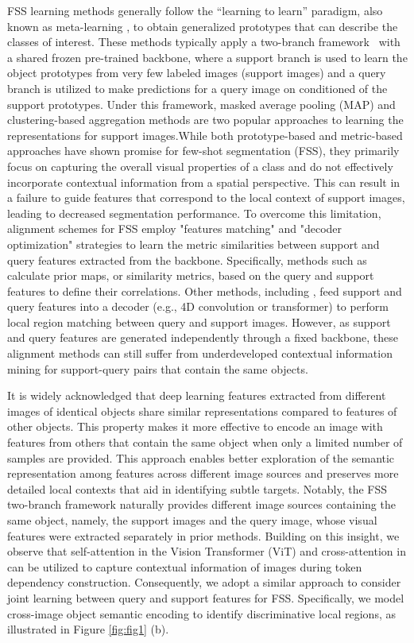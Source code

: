 \documentclass[conference]{IEEEtran}
\begin{document}
FSS learning methods generally follow the ``learning to learn'' paradigm, also known as meta-learning \cite{Siamese, tian2020rethinking}, to obtain generalized prototypes that can describe the classes of interest. 
These methods typically apply a two-branch framework~\cite{RN4, RN5,RN10} with a shared frozen pre-trained backbone, where a support branch is used to learn the object prototypes from very few labeled images (support images) and a query branch is utilized to make predictions for a query image on conditioned of the support prototypes. 
Under this framework, masked average pooling (MAP) \cite{ RN5, PANet, RN10} and clustering-based aggregation methods \cite{RN6, ASGNet, Part-aware-prototype} are two popular approaches to learning the representations for support images.While both prototype-based and metric-based approaches have shown promise for few-shot segmentation (FSS), they primarily focus on capturing the overall visual properties of a class and do not effectively incorporate contextual information from a spatial perspective. This can result in a failure to guide features that correspond to the local context of support images, leading to decreased segmentation performance. To overcome this limitation, alignment schemes for FSS employ "features matching" and "decoder optimization" strategies to learn the metric similarities between support and query features extracted from the backbone. Specifically, methods such as \cite{PFENet, ASGNet, MLC} calculate prior maps, or similarity metrics, based on the query and support features to define their correlations. Other methods, including \cite{CWTans, CyCTR, HSNet}, feed support and query features into a decoder (e.g., 4D convolution or transformer) to perform local region matching between query and support images. However, as support and query features are generated independently through a fixed backbone, these alignment methods can still suffer from underdeveloped contextual information mining for support-query pairs that contain the same objects.

It is widely acknowledged that deep learning features extracted from different images of identical objects share similar representations compared to features of other objects. This property makes it more effective to encode an image with features from others that contain the same object when only a limited number of samples are provided. This approach enables better exploration of the semantic representation among features across different image sources and preserves more detailed local contexts that aid in identifying subtle targets. Notably, the FSS two-branch framework naturally provides different image sources containing the same object, namely, the support images and the query image, whose visual features were extracted separately in prior methods. Building on this insight, we observe that self-attention in the Vision Transformer (ViT) \cite{ViT} and cross-attention in \cite{crossattention} can be utilized to capture contextual information of images during token dependency construction. Consequently, we adopt a similar approach to consider joint learning between query and support features for FSS. Specifically, we model cross-image object semantic encoding to identify discriminative local regions, as illustrated in Figure \ref{fig:fig1} (b).
\end{document}
